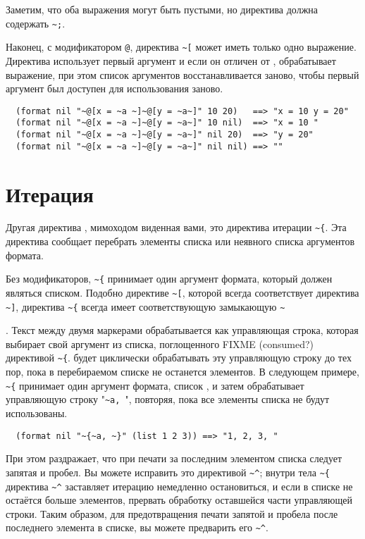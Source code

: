 {Заметим, что оба выражения могут быть пустыми, но директива должна содержать
\lstinline!~;!.

Наконец, с модификатором \lstinline!@!, директива \lstinline!~[! может иметь только одно
выражение. Директива использует первый аргумент и если он отличен от ,
обрабатывает выражение, при этом список аргументов восстанавливается заново, чтобы первый
аргумент был доступен для использования заново.

\begin{verbatim}
  (format nil "~@[x = ~a ~]~@[y = ~a~]" 10 20)   ==> "x = 10 y = 20"
  (format nil "~@[x = ~a ~]~@[y = ~a~]" 10 nil)  ==> "x = 10 "
  (format nil "~@[x = ~a ~]~@[y = ~a~]" nil 20)  ==> "y = 20"
  (format nil "~@[x = ~a ~]~@[y = ~a~]" nil nil) ==> ""
\end{verbatim}

\section{Итерация}

Другая директива , мимоходом виденная вами, это директива итерации
\lstinline!~{!. Эта директива сообщает  перебрать элементы списка или
  неявного списка аргументов формата.

Без модификаторов, \lstinline!~{! принимает один аргумент формата, который должен являться списком. Подобно директиве
\lstinline!~[!, которой всегда соответствует директива \lstinline!~]!, директива \lstinline!~{! всегда имеет соответствующую замыкающую
\lstinline!~!}. Текст между двумя маркерами обрабатывается как управляющая строка, которая выбирает свой аргумент из
списка, поглощенного FIXME (consumed?)  директивой \lstinline!~{!.  будет циклически обрабатывать эту
управляющую строку до тех пор, пока в перебираемом списке не останется элементов. В следующем примере, \lstinline!~{!
принимает один аргумент формата, список , и затем обрабатывает управляющую строку "\lstinline!~a, !", повторяя,
пока все элементы списка не будут использованы.

\begin{verbatim}
  (format nil "~{~a, ~}" (list 1 2 3)) ==> "1, 2, 3, "
\end{verbatim}

При этом раздражает, что при печати за последним элементом списка следует запятая и пробел. Вы можете исправить
это директивой \lstinline!~^!; внутри тела \lstinline!~{! директива \lstinline!~^! заставляет итерацию немедленно остановиться, и если в
списке не остаётся больше элементов, прервать обработку оставшейся части управляющей строки. Таким образом, для
предотвращения печати запятой и пробела после последнего элемента в списке, вы можете предварить его \lstinline!~^!.

